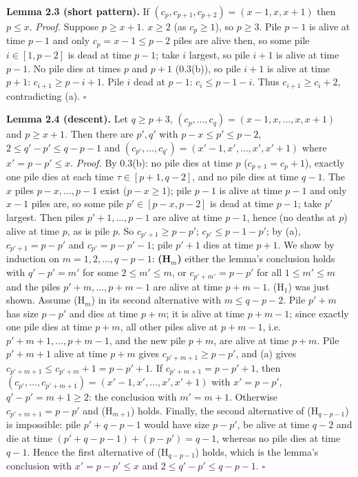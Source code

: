 \documentclass[11pt,a4paper]{article}
\begin{document}
\textbf{Lemma 2.3 (short pattern).} If
\((c_p,c_{p+1},c_{p+2})=(x-1,x,x+1)\) then \(p\le x\). \emph{Proof.}
Suppose \(p\ge x+1\). \(x\ge2\) (as \(c_p\ge1\)), so \(p\ge3\). Pile
\(p-1\) is alive at time \(p-1\) and only \(c_p=x-1\le p-2\) piles are
alive then, so some pile \(i\in[1,p-2]\) is dead at time \(p-1\); take
\(i\) largest, so pile \(i+1\) is alive at time \(p-1\). No pile dies at
times \(p\) and \(p+1\) (0.3(b)), so pile \(i+1\) is alive at time
\(p+1\): \(c_{i+1}\ge p-i+1\). Pile \(i\) dead at \(p-1\):
\(c_i\le p-1-i\). Thus \(c_{i+1}\ge c_i+2\), contradicting (a).
\(\square\)

\textbf{Lemma 2.4 (descent).} Let \(q\ge p+3\),
\((c_p,\dots,c_q)=(x-1,x,\dots,x,x+1)\) and \(p\ge x+1\). Then there are
\(p',q'\) with \(p-x\le p'\le p-2\), \(2\le q'-p'\le q-p-1\) and
\((c_{p'},\dots,c_{q'})=(x'-1,x',\dots,x',x'+1)\) where
\(x'=p-p'\le x\). \emph{Proof.} By 0.3(b): no pile dies at time \(p\)
(\(c_{p+1}=c_p+1\)), exactly one pile dies at each time
\(\tau\in[p+1,q-2]\), and no pile dies at time \(q-1\). The \(x\) piles
\(p-x,\dots,p-1\) exist (\(p-x\ge1\)); pile \(p-1\) is alive at time
\(p-1\) and only \(x-1\) piles are, so some pile \(p'\in[p-x,p-2]\) is
dead at time \(p-1\); take \(p'\) largest. Then piles \(p'+1,\dots,p-1\)
are alive at time \(p-1\), hence (no deaths at \(p\)) alive at time
\(p\), as is pile \(p\). So \(c_{p'+1}\ge p-p'\); \(c_{p'}\le p-1-p'\);
by (a), \(c_{p'+1}=p-p'\) and \(c_{p'}=p-p'-1\); pile \(p'+1\) dies at
time \(p+1\). We show by induction on \(m=1,2,\dots,q-p-1\):
\textbf{(H\(_m\))} either the lemma's conclusion holds with \(q'-p'=m'\)
for some \(2\le m'\le m\), or \(c_{p'+m'}=p-p'\) for all
\(1\le m'\le m\) and the piles \(p'+m,\dots,p+m-1\) are alive at time
\(p+m-1\). (H\(_1\)) was just shown. Assume (H\(_m\)) in its second
alternative with \(m\le q-p-2\). Pile \(p'+m\) has size \(p-p'\) and
dies at time \(p+m\); it is alive at time \(p+m-1\); since exactly one
pile dies at time \(p+m\), all other piles alive at \(p+m-1\),
i.e.~\(p'+m+1,\dots,p+m-1\), and the new pile \(p+m\), are alive at time
\(p+m\). Pile \(p'+m+1\) alive at time \(p+m\) gives
\(c_{p'+m+1}\ge p-p'\), and (a) gives
\(c_{p'+m+1}\le c_{p'+m}+1=p-p'+1\). If \(c_{p'+m+1}=p-p'+1\), then
\((c_{p'},\dots,c_{p'+m+1})=(x'-1,x',\dots,x',x'+1)\) with \(x'=p-p'\),
\(q'-p'=m+1\ge2\): the conclusion with \(m'=m+1\). Otherwise
\(c_{p'+m+1}=p-p'\) and (H\(_{m+1}\)) holds. Finally, the second
alternative of (H\(_{q-p-1}\)) is impossible: pile \(p'+q-p-1\) would
have size \(p-p'\), be alive at time \(q-2\) and die at time
\((p'+q-p-1)+(p-p')=q-1\), whereas no pile dies at time \(q-1\). Hence
the first alternative of (H\(_{q-p-1}\)) holds, which is the lemma's
conclusion with \(x'=p-p'\le x\) and \(2\le q'-p'\le q-p-1\).
\(\square\)
\end{document}
